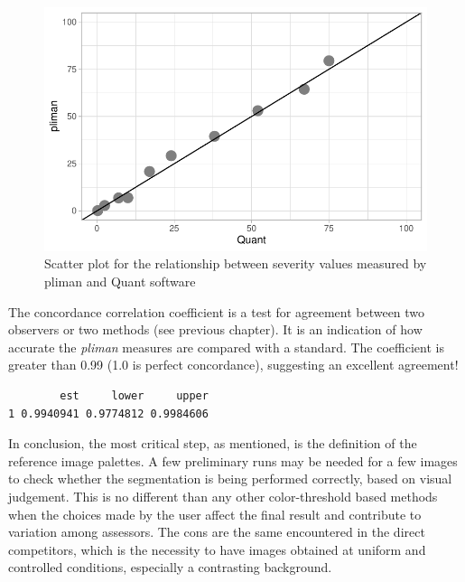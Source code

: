 \documentclass[
  letterpaper,
  DIV=11,
  numbers=noendperiod]{scrreprt}
\newenvironment{Shaded}{\begin{snugshade}}{\end{snugshade}}
\newcommand{\FunctionTok}[1]{\textcolor[rgb]{0.28,0.35,0.67}{#1}}
\newcommand{\NormalTok}[1]{\textcolor[rgb]{0.00,0.23,0.31}{#1}}
\newcommand{\OtherTok}[1]{\textcolor[rgb]{0.00,0.23,0.31}{#1}}
\newcommand{\SpecialCharTok}[1]{\textcolor[rgb]{0.37,0.37,0.37}{#1}}
\begin{document}
\begin{figure}[H]

{\centering \includegraphics{./data-actual-severity_files/figure-pdf/fig-scatter-1.pdf}

}

\caption{\label{fig-scatter}Scatter plot for the relationship between
severity values measured by pliman and Quant software}

\end{figure}

The concordance correlation coefficient is a test for agreement between
two observers or two methods (see previous chapter). It is an indication
of how accurate the \emph{pliman} measures are compared with a standard.
The coefficient is greater than 0.99 (1.0 is perfect concordance),
suggesting an excellent agreement!

\begin{Shaded}
\end{Shaded}

\begin{verbatim}
        est     lower     upper
1 0.9940941 0.9774812 0.9984606
\end{verbatim}

In conclusion, the most critical step, as mentioned, is the definition
of the reference image palettes. A few preliminary runs may be needed
for a few images to check whether the segmentation is being performed
correctly, based on visual judgement. This is no different than any
other color-threshold based methods when the choices made by the user
affect the final result and contribute to variation among assessors. The
cons are the same encountered in the direct competitors, which is the
necessity to have images obtained at uniform and controlled conditions,
especially a contrasting background.
\end{document}
